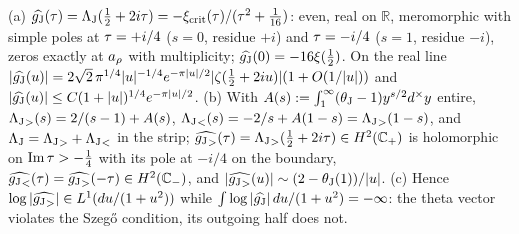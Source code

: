 \begin{proposition}
\label{prop:theta-vector-mellin}
(a) $\widehat{g_{\mathrm J}}(\tau) = \Lambda_{\mathrm J}(\tfrac12+2i\tau) = -\xi_{\mathrm{crit}}(\tau)/(\tau^2+\tfrac1{16})$: even, real on
$\mathbb R$, meromorphic with simple poles at $\tau = +i/4$ ($s = 0$, residue $+i$) and $\tau = -i/4$ ($s = 1$,
residue $-i$), zeros exactly at $a_\rho$ with multiplicity; $\widehat{g_{\mathrm J}}(0) = -16\xi(\tfrac12)$. On the real line
$|\widehat{g_{\mathrm J}}(u)| = 2\sqrt2\,\pi^{1/4}|u|^{-1/4}e^{-\pi|u|/2}|\zeta(\tfrac12+2iu)|(1+O(1/|u|))$ and
$|\widehat{g_{\mathrm J}}(u)|\le C(1+|u|)^{1/4}e^{-\pi|u|/2}$. (b) With $A(s) := \int_1^\infty(\theta_{\mathrm J}-1)y^{s/2}d^\times y$ entire,
${\Lambda_{\mathrm J}}_{>}(s) = 2/(s-1) + A(s)$, ${\Lambda_{\mathrm J}}_{<}(s) = -2/s + A(1-s) = {\Lambda_{\mathrm J}}_{>}(1-s)$, and $\Lambda_{\mathrm J} = {\Lambda_{\mathrm J}}_{>}+{\Lambda_{\mathrm J}}_{<}$
in the strip; $\widehat{{g_{\mathrm J}}_{>}}(\tau) = {\Lambda_{\mathrm J}}_{>}(\tfrac12+2i\tau)\in H^2(\mathbb C_+)$ is holomorphic on $\operatorname{Im}\tau>-\tfrac14$
with its pole at $-i/4$ on the boundary, $\widehat{{g_{\mathrm J}}_{<}}(\tau) = \widehat{{g_{\mathrm J}}_{>}}(-\tau)\in H^2(\mathbb C_-)$, and
$|\widehat{{g_{\mathrm J}}_{>}}(u)|\sim(2-\theta_{\mathrm J}(1))/|u|$. (c) Hence $\log|\widehat{{g_{\mathrm J}}_{>}}|\in L^1(du/(1+u^2))$ while
$\int\log|\widehat{g_{\mathrm J}}|\,du/(1+u^2) = -\infty$: the theta vector violates the Szeg\H o condition, its outgoing half
does not.
\end{proposition}

